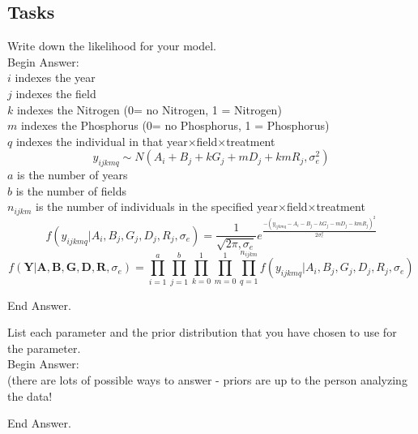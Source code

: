 \documentclass[11pt]{article}
\newcommand{\answer}[1]{{\color{red}\sc Begin Answer:\\}#1{\par\color{red}\sc End Answer.\\}}
\begin{document}
\subsection*{Tasks}
\begin{compactenum}
	\item Write down the likelihood for your model.
	\\\answer{
	$i$ indexes the year\\
	$j$ indexes the field\\
	$k$ indexes the Nitrogen (0= no Nitrogen, 1 = Nitrogen)\\
	$m$ indexes the Phosphorus (0= no Phosphorus, 1 = Phosphorus) \\
	$q$ indexes the individual in that year$\times$field$\times$treatment\\
	$$y_{ijkmq} \sim N(A_i + B_j + kG_j + mD_j + kmR_j, \sigma_e^2)$$
	$a$ is the number of years\\
	$b$ is the number of fields\\
	$n_{ijkm}$ is the number of individuals in the specified year$\times$field$\times$treatment\\
	$$f(y_{ijkmq}|A_i, B_j, G_j, D_j, R_j, \sigma_e) = \frac{1}{\sqrt{2\pi,\sigma_e}}e^{\frac{-(y_{ijkmq} - A_i - B_j - kG_j - mD_j - kmR_j)^2}{2\sigma_e^2}}$$
	$$f(\bm Y|\bm A, \bm B,\bm G,\bm D,\bm R, \sigma_e) = \prod_{i=1}^a \prod_{j=1}^b\prod_{k=0}^1\prod_{m=0}^1\prod_{q=1}^{n_{ijkm}} f(y_{ijkmq}|A_i, B_j, G_j, D_j, R_j, \sigma_e) $$
	}
	\item List each parameter and the prior distribution that you have chosen to use for the parameter.
	\\\answer{ (there are lots of possible ways to answer - priors are up to the person analyzing the data!

}
\end{compactenum}
\end{document}
